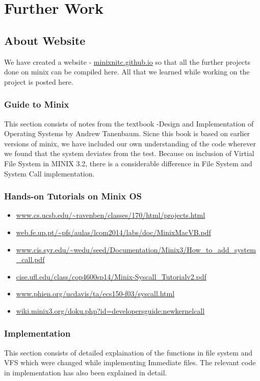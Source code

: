 \chapter{Further Work}

\section {About Website}
We have created a website - \url{minixnitc.github.io} so that all the further projects done on minix can be compiled here. All that we learned while working on the project is posted here.

\subsection{Guide to Minix}
This section consists of notes from the textbook -Design and Implementation of Operating Systems by Andrew Tanenbaum. Sicne this book is based on earlier versions of minix, we have included our own understanding of the code wherever we found that the system deviates from the test. Because on inclusion of Virtial File System in MINIX 3.2, there is a considerable difference in File System and System Call implementation.
\subsection{Hands-on Tutorials on Minix OS}
\begin{itemize}
\item \url{www.cs.ucsb.edu/~ravenben/classes/170/html/projects.html}
\item \url{web.fe.up.pt/~pfs/aulas/lcom2014/labs/doc/MinixMacVB.pdf}
\item \url{www.cis.syr.edu/~wedu/seed/Documentation/Minix3/How_to_add_system_call.pdf}
\item \url{cise.ufl.edu/class/cop4600sp14/Minix-Syscall_Tutorialv2.pdf}
\item \url{www.phien.org/ucdavis/ta/ecs150-f03/syscall.html}
\item \url{wiki.minix3.org/doku.php?id=developersguide:newkernelcall}

\end{itemize}

\subsection {Implementation}
This section consists of detailed explaination of the functions in file system and VFS which were changed while implementing Immediate files.
The relevant code in implementation has also been explained in detail.

